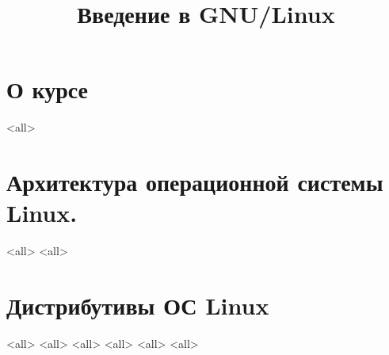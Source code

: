 

\title{Введение в GNU/Linux}




\begin{frame}
	\frametitle{}
	\titlepage
	\vspace{-0.5cm}
	\begin{center}
	\end{center}
\end{frame}


\begin{frame}
	\tableofcontents
	[hideallsubsections]
\end{frame}


\section{О курсе}

\mode<all>{}

\section{Архитектура операционной системы Linux. }

\mode<all>{}
\mode<all>{}

\section{Дистрибутивы ОС Linux}
\mode<all>{}
\mode<all>{}
\mode<all>{}
\mode<all>{}
\mode<all>{}
\mode<all>{}

